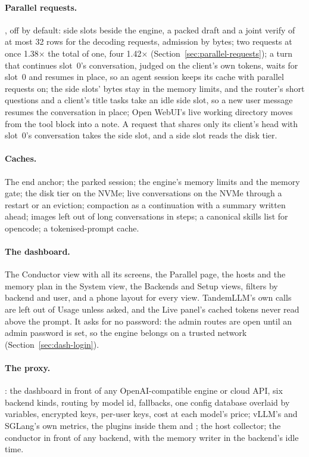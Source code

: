 \paragraph{Parallel requests.} , off by default: side slots beside the engine, a packed draft and a joint verify of at most 32 rows for the decoding requests, admission by bytes; two requests at once 1.38$\times$ the total of one, four 1.42$\times$ (Section~\ref{sec:parallel-requests}); a turn that continues slot~0's conversation, judged on the client's own tokens, waits for slot~0 and resumes in place, so an agent session keeps its cache with parallel requests on; the side slots' bytes stay in the memory limits, and the router's short questions and a client's title tasks take an idle side slot, so a new user message resumes the conversation in place; Open WebUI's live working directory moves from the tool block into a note. A request that shares only its client's head with slot~0's conversation takes the side slot, and a side slot reads the disk tier.

\paragraph{Caches.} The end anchor; the parked session; the engine's memory limits and the memory gate; the disk tier on the NVMe; live conversations on the NVMe through a restart or an eviction; compaction as a continuation with a summary written ahead; images left out of long conversations in steps; a canonical skills list for opencode; a tokenised-prompt cache.

\paragraph{The dashboard.} The Conductor view with all its screens, the Parallel page, the hosts and the memory plan in the System view, the Backends and Setup views, filters by backend and user, and a phone layout for every view. TandemLLM's own calls are left out of Usage unless asked, and the Live panel's cached tokens never read above the prompt. It asks for no password: the admin routes are open until an admin password is set, so the engine belongs on a trusted network (Section~\ref{sec:dash-login}).

\paragraph{The proxy.} : the dashboard in front of any OpenAI-compatible engine or cloud API, six backend kinds, routing by model id, fallbacks, one config database overlaid by  variables, encrypted keys, per-user keys, cost at each model's price; vLLM's and SGLang's own metrics, the plugins inside them and ; the host collector; the conductor in front of any backend, with the memory writer in the backend's idle time.

